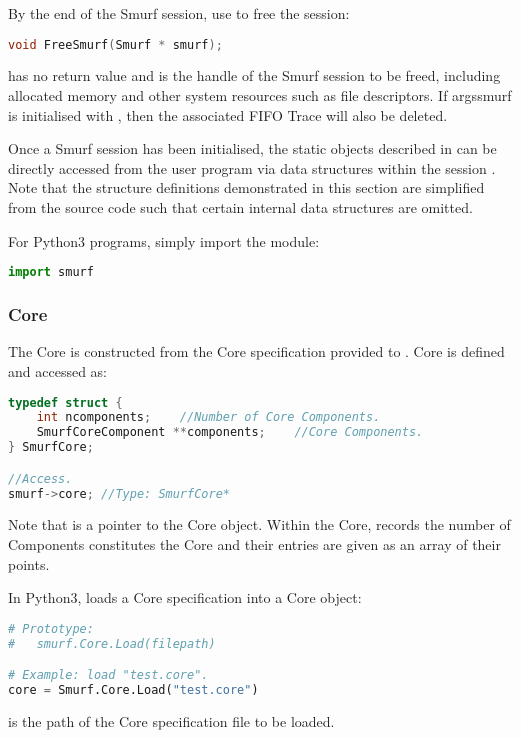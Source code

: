 By the end of the Smurf session, use  to free the session:
\begin{lstlisting}[language=C++,caption={FreeSmurf()\label{api:FreeSmurfC}}]
void FreeSmurf(Smurf * smurf);
\end{lstlisting}

 has no return value and  is the handle of the Smurf session to be freed, including allocated memory and other system resources such as file descriptors. If args{smurf} is initialised with , then the associated FIFO Trace will also be deleted.

Once a Smurf session has been initialised, the static \smurf objects described in  can be directly accessed from the user program via data structures within the session . Note that the structure definitions demonstrated in this section are simplified from the source code such that certain internal data structures are omitted.

For Python3 programs, simply import the  module:
\begin{lstlisting}[language=Python,caption={Importing Smurf module\label{api:ImportSmurfP}}]
	import smurf
\end{lstlisting}

\subsubsection{Core}
The Core is constructed from the Core specification  provided to . Core is defined and accessed as:
\begin{lstlisting}[language=C++, caption={struct SmurfCore\label{api:CoreC}}]
typedef struct {
	int ncomponents;	//Number of Core Components.
	SmurfCoreComponent **components;	//Core Components.
} SmurfCore;

//Access.
smurf->core; //Type: SmurfCore*
\end{lstlisting}

Note that  is a pointer to the Core object. Within the Core,  records the number of Components constitutes the Core and their entries are given as an array of their points. 

In Python3,  loads a Core specification into a Core object:
\begin{lstlisting}[language=Python,caption={smurf.Core.Load()\label{api:Core.LoadP}}]
# Prototype:
#	smurf.Core.Load(filepath)

# Example: load "test.core".	
core = Smurf.Core.Load("test.core")
\end{lstlisting}
 is the path of the Core specification file to be loaded.


